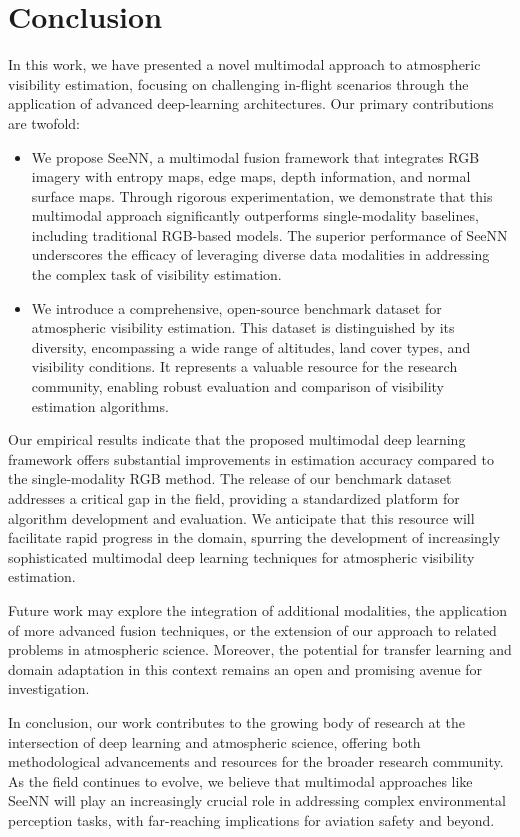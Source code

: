 \section{Conclusion}

In this work, we have presented a novel multimodal approach to atmospheric visibility estimation, focusing on challenging in-flight scenarios through the application of advanced deep-learning architectures. Our primary contributions are twofold:

\begin{itemize}
    \item We propose SeeNN, a multimodal fusion framework that integrates RGB imagery with entropy maps, edge maps, depth information, and normal surface maps. Through rigorous experimentation, we demonstrate that this multimodal approach significantly outperforms single-modality baselines, including traditional RGB-based models. The superior performance of SeeNN underscores the efficacy of leveraging diverse data modalities in addressing the complex task of visibility estimation.
    \item We introduce a comprehensive, open-source benchmark dataset for atmospheric visibility estimation. This dataset is distinguished by its diversity, encompassing a wide range of altitudes, land cover types, and visibility conditions. It represents a valuable resource for the research community, enabling robust evaluation and comparison of visibility estimation algorithms.
\end{itemize}


Our empirical results indicate that the proposed multimodal deep learning framework offers substantial improvements in estimation accuracy compared to the single-modality RGB method.  The release of our benchmark dataset addresses a critical gap in the field, providing a standardized platform for algorithm development and evaluation. We anticipate that this resource will facilitate rapid progress in the domain, spurring the development of increasingly sophisticated multimodal deep learning techniques for atmospheric visibility estimation.

Future work may explore the integration of additional modalities, the application of more advanced fusion techniques, or the extension of our approach to related problems in atmospheric science. Moreover, the potential for transfer learning and domain adaptation in this context remains an open and promising avenue for investigation.

In conclusion, our work contributes to the growing body of research at the intersection of deep learning and atmospheric science, offering both methodological advancements and resources for the broader research community. As the field continues to evolve, we believe that multimodal approaches like SeeNN will play an increasingly crucial role in addressing complex environmental perception tasks, with far-reaching implications for aviation safety and beyond.

